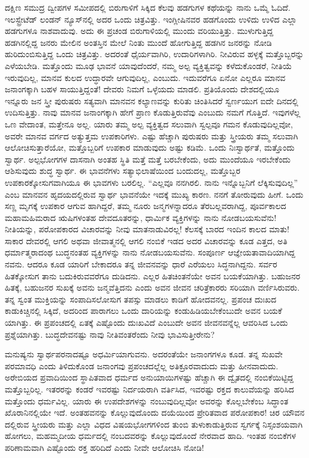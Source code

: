 ದಕ್ಷಿಣ ಸಮುದ್ರ ದ್ವೀಪಗಳ ಸಮೀಪದಲ್ಲಿ ಬಿರುಗಾಳಿಗೆ ಸಿಕ್ಕಿದ ಕೆಲವು ಹಡಗುಗಳ ಕಥೆಯನ್ನು ನಾನು ಒಮ್ಮೆ ಓದಿದೆ. ಇಲಸ್ಟ್ರೇಟೆಡ್​ ಲಂಡನ್​ ನ್ಯೂಸ್​ನಲ್ಲಿ ಅದರ ಒಂದು ಚಿತ್ರವಿತ್ತು. ಇಂಗ್ಲೀಷಿನವರ ಹಡಗೊಂದು ಉಳಿದು ಉಳಿದ ಎಲ್ಲಾ ಹಡಗುಗಳೂ ನಾಶವಾದುವು. ಅದು ಈ ಪ್ರಚಂಡ ಬಿರುಗಾಳಿಯಲ್ಲಿ ಮುಂದು ವರಿಯುತ್ತಿತ್ತು. ಮುಳುಗುತ್ತಿದ್ದ ಹಡಗಿನಲ್ಲಿದ್ದ ಜನರು ಮೇಲಿನ ಅಂತಸ್ತಿನ ಮೇಲೆ ನಿಂತು ಮುಂದೆ ಹೋಗುತ್ತಿದ್ದ ಹಡಗಿನ ಜನರನ್ನು ನೋಡಿ ಹುರಿದುಂಬಿಸುತ್ತಿದ್ದ ಒಂದು ಚಿತ್ರವಿತ್ತು. ಅದರಂತೆ ಧೈರ್ಯವಾಗಿರಿ, ಉದಾರಿಗಳಾಗಿರಿ. ನೀವಿರುವ ಹಳ್ಳಕ್ಕೆ ಮತ್ತೊಬ್ಬರನ್ನು ಎಳೆಯಬೇಡಿ. ಮತ್ತೊಂದು ಮೂಢ ಭಾವನೆ ಯಾವುದೆಂದರೆ, ನಮ್ಮ ಅಲ್ಪ ವ್ಯಕ್ತಿತ್ವವನ್ನು ಕಳೆದುಕೊಂಡರೆ, ನೀತಿಯೆ ಇರುವುದಿಲ್ಲ, ಮಾನವ ಕುಲದ ಉದ್ಧಾರವೇ ಆಗುವುದಿಲ್ಲ, ಎಂಬುದು. ಇದುವರೆಗೂ ಏನೋ ಎಲ್ಲರೂ ಮಾನವ ಜನಾಂಗಕ್ಕಾಗಿ ಬಹಳ ಸಾಯುತ್ತಿದ್ದಂತೆ! ದೇವರು ನಿಮಗೆ ಒಳ್ಳೆಯದು ಮಾಡಲಿ. ಪ್ರತಿಯೊಂದು ದೇಶದಲ್ಲಿಯೂ ಇನ್ನೂರು ಜನ ಸ್ತ್ರೀ ಪುರುಷರು ಸತ್ಯವಾಗಿ ಮಾನವನ ಕಲ್ಯಾಣವನ್ನು ಕುರಿತು ಚಿಂತಿಸಿದರೆ ಸ್ವರ್ಣಯುಗ ಐದೇ ದಿನದಲ್ಲಿ ಉದಿಸುತ್ತಿತ್ತು. ನಾವು ಮಾನವ ಜನಾಂಗಕ್ಕಾಗಿ ಹೇಗೆ ಪ್ರಾಣ ಕೊಡುತ್ತಿರುವೆವು ಎಂಬುದು ನಮಗೆ ಗೊತ್ತಿದೆ. ಇವುಗಳೆಲ್ಲ ಒಣ ವೇದಾಂತ, ಮತ್ತೇನೂ ಅಲ್ಲ. ಯಾರು ತಮ್ಮ ಅಲ್ಪ ವ್ಯಕ್ತಿತ್ವದ ಸಲುವಾಗಿ ಸ್ವಲ್ಪವೂ ಗಮನ ಕೊಡುವುದಿಲ್ಲವೋ, ಅವರೇ ಮಾನವ ವರ್ಗದ ಅತ್ಯುತ್ತಮ ಉಪಕಾರಿಗಳು. ಎಷ್ಟು ಹೆಚ್ಚಾಗಿ ಪುರುಷರು ಮತ್ತು ಸ್ತ್ರೀಯರು ತಮ್ಮ ಸಲುವಾಗಿ ಆಲೋಚಿಸುತ್ತಾರೆಯೋ, ಮತ್ತೊಬ್ಬರಿಗೆ ಉಪಕಾರ ಮಾಡುವುದು ಅಷ್ಟು ಕಡಿಮೆ. ಒಂದು ನಿಃಸ್ವಾರ್ಥತೆ, ಮತ್ತೊಂದು ಸ್ವಾರ್ಥ. ಅಲ್ಪಭೋಗಗಳ ದಾಸನಾಗಿ ಅಂತಹ ಸ್ಥಿತಿ ಮತ್ತೆ ಮತ್ತೆ ಬರಬೇಕೆಂದು, ಅದು ಮುಂದೆಯೂ ಇರಬೇಕೆಂದು ಆಶಿಸುವುದು ಶುದ್ಧ ಸ್ವಾರ್ಥ. ಈ ಭಾವನೆಗಳು ಸತ್ಯಾಭಿಲಾಷೆಯಿಂದ ಬಂದುದಲ್ಲ, ಮತ್ತೊಬ್ಬರ ಉಪಕಾರಕ್ಕೋಸುಗವಾಗಿಯೂ ಈ ಭಾವಗಳು ಬರಲಿಲ್ಲ. “ಎಲ್ಲವೂ ನನಗಿರಲಿ. ನಾನು ಇನ್ನೊಬ್ಬನಿಗೆ ಲೆಕ್ಕಿಸುವುದಿಲ್ಲ” ಎಂಬ ಮಾನವನ ಹೃದಯದಲ್ಲಿರುವ ಸ್ವಾರ್ಥ ಭಾವನೆಯೇ ಇದಕ್ಕೆ ಮುಖ್ಯ ಕಾರಣ. ನನಗೆ ತೋರುವುದು ಹೀಗೆ. ಒಂದು ಸಣ್ಣ ಮೃಗಕ್ಕೆ ಉಪಕಾರ ಆಗುವ ಹಾಗಿದ್ದರೆ, ತಮ್ಮ ನೂರು ಜನ್ಮಗಳನ್ನಾದರೂ ತೆರಬಲ್ಲವರಾಗಿದ್ದ, ಪೂರ್ವಕಾಲದ ಮಹಾಮಹಿಮರಾದ ಋಷಿಗಳಂತಹ ದೇವದೂತರನ್ನು, ಧಾರ್ಮಿಕ ವ್ಯಕ್ತಿಗಳನ್ನು ನಾನು ನೋಡಬಯಸುವೆನು! ನೀತಿಯನ್ನು, ಪರೋಪಕಾರದ ವಿಚಾರವನ್ನು ನೀವು ಮಾತನಾಡುವಿರಲ್ಲ! ಕೆಲಸಕ್ಕೆ ಬಾರದ ಇಂದಿನ ಕಾಲದ ಮಾತು! ಸಾಕಾರ ದೇವರಲ್ಲಿ ಆಗಲಿ ಅಥವಾ ಜೀವಾತ್ಮನಲ್ಲಿ ಆಗಲಿ ನಂಬಿಕೆ ಇಡದ ಅದರ ವಿಚಾರವನ್ನು ಕೂಡ ಎತ್ತದ, ಅತಿ ಧರ್ಮಾತ್ಮರಾದಂಥ ಬುದ್ಧನಂತಹ ವ್ಯಕ್ತಿಗಳನ್ನು ನಾನು ನೋಡಬಯಸುವೆನು. ಸಂಪೂರ್ಣ ಆಜ್ಞೇಯತಾವಾದಿಯಾಗಿದ್ದ ನವನು. ಆದರೂ ಕೂಡ ಯಾರಿಗೆ ಬೇಕಾದರೂ ತನ್ನ ಜೀವನವನ್ನು ಧಾರೆ ಎರೆಯಲು ಸಿದ್ಧನಾಗಿದ್ದನು. ಸರ್ವರ ಹಿತಕ್ಕೋಸುಗ ತಾನು ಬದುಕಿರುವವರೆಗೂ ದುಡಿದನು. ಎಲ್ಲರ ಹಿತಚಿಂತನೆಯೇ ಅವನ ಬಯಕೆಯಾಗಿತ್ತು. ಬಹುಜನರ ಹಿತಕ್ಕೆ, ಬಹುಜನರ ಸುಖಕ್ಕೆ ಅವನು ಜನ್ಮವೆತ್ತಿದನು ಎಂದು ಅವನ ಜೀವನ ಚರಿತ್ರೆಕಾರರು ಸರಿಯಾಗಿ ವರ್ಣಿಸಿರುವರು. ತನ್ನ ಸ್ವಂತ ಮುಕ್ತಿಯನ್ನು ಸಂಪಾದಿಸಲೋಸುಗ ತಪಸ್ಸು ಮಾಡಲು ಕಾಡಿಗೆ ಹೋದವನಲ್ಲ. ಪ್ರಪಂಚ ದುಃಖದ ಕಾಡುಕಿಚ್ಚಿನಲ್ಲಿ ಸಿಕ್ಕಿದೆ, ಅದರಿಂದ ಪಾರಾಗಲು ಒಂದು ದಾರಿಯನ್ನು ಕಂಡುಹಿಡಿಯಬೇಕೆಂಬುದೇ ಅವನ ಬಯಕೆ ಯಾಗಿತ್ತು. ಈ ಪ್ರಪಂಚದಲ್ಲಿ ಏತಕ್ಕೆ ಎಷ್ಟೊಂದು ದುಃಖವಿದೆ ಎಂಬುದೇ ಅವನ ಜೀವನವನ್ನೆಲ್ಲ ಆವರಿಸಿದ ಒಂದು ಪ್ರಶ್ನೆಯಾಗಿತ್ತು. ಬುದ್ಧದೇವನಷ್ಟು ನಾವು ನೀತಿವಂತರೆಂದು ನೀವು ಭಾವಿಸುತ್ತೀರೇನು?

ಮನುಷ್ಯನು ಸ್ವಾರ್ಥಪರನಾದಷ್ಟೂ ಅಧರ್ಮಿಯಾಗುವನು. ಅದರಂತೆಯೇ ಜನಾಂಗಗಳೂ ಕೂಡ. ತನ್ನ ಸುಖವೇ ಪರಮಾವಧಿ ಎಂದು ತಿಳಿದುಕೊಂಡ ಜನಾಂಗವು ಪ್ರಪಂಚದಲ್ಲೆಲ್ಲ ಅತಿಕ್ರೂರವಾದುದು ಮತ್ತು ಹೀನವಾದುದು. ಅರೇಬಿಯದ ಪ್ರವಾದಿಯಿಂದ ಸ್ಥಾಪಿತವಾದ ಧರ್ಮದ ಅನುಯಾಯಿಗಳಷ್ಟು ಹೆಚ್ಚಾಗಿ ಈ ದ್ವೈತದಲ್ಲಿ ನಂಬಿಕೆಯಿಟ್ಟಿದ್ದ ಮತ್ತೊಬ್ಬರಿಲ್ಲ. ಇತರರನ್ನು ಕಂಡರೆ ಇವರಷ್ಟು ನಿರ್ದಯರಾಗಿ ವರ್ತಿಸಿದ, ಇವರಷ್ಟು ರಕ್ತದ ಕಾಲುವೆಯನ್ನು ಹರಿಸಿದ ಮತ್ತೊಂದು ಧರ್ಮವಿಲ್ಲ. ಯಾರು ಈ ಉಪದೇಶಗಳನ್ನು ನಂಬುವುದಿಲ್ಲವೋ ಅವರನ್ನು ಕೊಲ್ಲಬೇಕೆಂಬ ಸಿದ್ಧಾಂತ ಖೊರಾನಿನಲ್ಲಿಯೇ ಇದೆ. ಅಂತಹವನನ್ನು ಕೊಲ್ಲುವುದೊಂದು ದಯೆಯಿಂದ ಪ್ರೇರಿತವಾದ ಪರೋಪಕಾರ! ಚಿರ ಯೌವನ ದಲ್ಲಿರುವ ಸ್ತ್ರೀಯರು ಮತ್ತು ಎಲ್ಲಾ ವಿಧದ ವಿಷಯಭೋಗಗಳಿಂದ ತುಂಬಿ ತುಳುಕಾಡುತ್ತಿರುವ ಸ್ವರ್ಗಕ್ಕೆ ನಿಸ್ಸಂಶಯವಾಗಿ ಹೋಗಲು, ಮಹಮ್ಮದೀಯ ಧರ್ಮದಲ್ಲಿ ನಂಬದವರನ್ನು ಕೊಲ್ಲುವುದೊಂದೆ ನೇರವಾದ ಹಾದಿ. ಇಂತಹ ನಂಬಿಕೆಗಳ ಪರಿಣಾಮವಾಗಿ ಎಷ್ಟೊಂದು ರಕ್ತ ಹರಿದಿದೆ ಎಂದು ನೀವೇ ಆಲೋಚಿಸಿ ನೋಡಿ!

